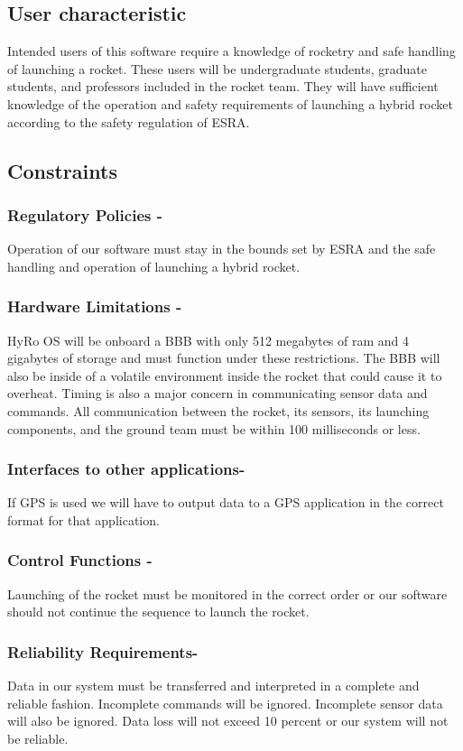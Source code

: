 \documentclass[10pt,draftclsnofoot,onecolumn,compsoc]{IEEEtran}
\begin{document}
\subsection{ User characteristic}
Intended users of this software require a knowledge of rocketry and safe handling of launching a rocket. These users will be undergraduate students, graduate students, and professors included in the rocket team. They will have sufficient knowledge of the operation and safety requirements of launching a hybrid rocket according to the safety regulation of ESRA.

\subsection{Constraints}
\subsubsection{ Regulatory Policies -} Operation of our software must stay in the bounds set by ESRA and the safe handling and operation of launching a hybrid rocket.  
\subsubsection{ Hardware Limitations -}HyRo OS will be onboard a BBB with only 512 megabytes of ram and 4 gigabytes of storage and must function under these restrictions. The BBB will also be inside of a volatile environment inside the rocket that could cause it to overheat. Timing is also a major concern in communicating sensor data and commands. All communication between the rocket, its sensors, its launching components, and the ground team must be within 100 milliseconds or less.
\subsubsection{ Interfaces to other applications-} If GPS is used we will have to output data to a GPS application in the correct format for that application.
\subsubsection{Control Functions -} Launching of the rocket must be monitored in the correct order or our software should not continue the sequence to launch the rocket.
\subsubsection{Reliability Requirements-} Data in our system must be transferred and interpreted in a complete and reliable fashion. Incomplete commands will be ignored. Incomplete sensor data will also be ignored. Data loss will not exceed 10 percent or our system will not be reliable.
\end{document}
